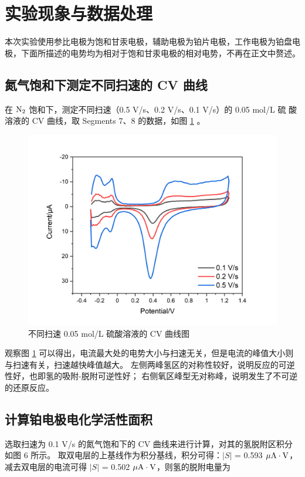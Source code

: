 \documentclass[cn,hazy,pku,12pt,normal,math=newtx,cite=super]{elegantnote}
\begin{document}
\section{实验现象与数据处理}

本次实验使用参比电极为饱和甘汞电极，辅助电极为铂片电极，工作电极为铂盘电极，下面所描述的电势均为相对于饱和甘汞电极的相对电势，不再在正文中赘述。

\subsection{氮气饱和下测定不同扫速的 CV 曲线}

在 $\rm N_2$ 饱和下，测定不同扫速（0.5 V/s、0.2 V/s、0.1 V/s）的 0.05 mol/L 硫
酸溶液的 CV 曲线，取 Segments 7、8 的数据，如图 \ref{4} 。

\begin{figure}[htbp]
    \centering
    \includegraphics[width = .70\textwidth]{image/Graph7.png}
    \caption{不同扫速 0.05 mol/L 硫酸溶液的 CV 曲线图}\label{4}
\end{figure}

观察图 \ref{4} 可以得出，电流最大处的电势大小与扫速无关，但是电流的峰值大小则与扫速有关，扫速越快峰值越大。
左侧两峰氢区的对称性较好，说明反应的可逆性好，也即氢的吸附-脱附可逆性好；
右侧氧区峰型无对称峰，说明发生了不可逆的还原反应。

\subsection{计算铂电极电化学活性面积}

选取扫速为 0.1 V/s 的氮气饱和下的 CV 曲线来进行计算，对其的氢脱附区积分如图 6 所示。
取双电层的上基线作为积分基线，积分可得：$|S|$ = 0.593 $\rm \mu A \cdot V$，减去双电层的电流可得
$|S|$ =  0.502 $\rm \mu A \cdot V$，则氢的脱附电量为
\end{document}
